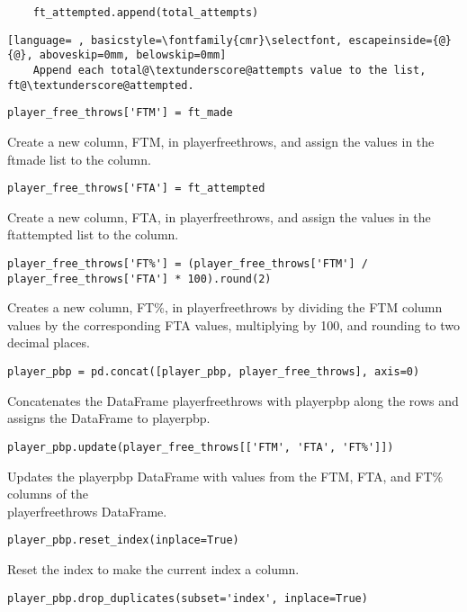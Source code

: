 \documentclass{article}
\begin{document}
\begin{lstlisting}
    ft_attempted.append(total_attempts)
\end{lstlisting}
\begin{lstlisting}[language= , basicstyle=\fontfamily{cmr}\selectfont, escapeinside={@}{@}, aboveskip=0mm, belowskip=0mm]
    Append each total@\textunderscore@attempts value to the list, ft@\textunderscore@attempted.
\end{lstlisting}
\begin{lstlisting}
player_free_throws['FTM'] = ft_made
\end{lstlisting}
Create a new column, FTM, in player\textunderscore free\textunderscore throws, and assign the values in the ft\textunderscore made list to the column.
\begin{lstlisting}
player_free_throws['FTA'] = ft_attempted
\end{lstlisting}
Create a new column, FTA, in player\textunderscore free\textunderscore throws, and assign the values in the ft\textunderscore attempted list to the column.
\begin{lstlisting}
player_free_throws['FT%'] = (player_free_throws['FTM'] / player_free_throws['FTA'] * 100).round(2)
\end{lstlisting}
Creates a new column, FT\%, in player\textunderscore free\textunderscore throws by dividing the FTM column values by the corresponding FTA values, multiplying by 100, and rounding to two decimal places.
\begin{lstlisting}
player_pbp = pd.concat([player_pbp, player_free_throws], axis=0)
\end{lstlisting}
Concatenates the DataFrame player\textunderscore free\textunderscore throws with player\textunderscore pbp along the rows and assigns the DataFrame to player\textunderscore pbp.
\begin{lstlisting}
player_pbp.update(player_free_throws[['FTM', 'FTA', 'FT%']])
\end{lstlisting}
Updates the player\textunderscore pbp DataFrame with values from the FTM, FTA, and FT\% columns of the\\
player\textunderscore free\textunderscore throws DataFrame.
\begin{lstlisting}
player_pbp.reset_index(inplace=True)
\end{lstlisting}
Reset the index to make the current index a column.
\begin{lstlisting}
player_pbp.drop_duplicates(subset='index', inplace=True)
\end{lstlisting}
\end{document}
